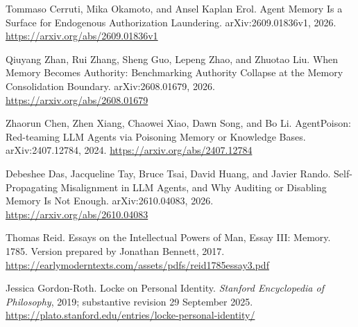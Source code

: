 Tommaso Cerruti, Mika Okamoto, and Ansel Kaplan Erol.
\newblock Agent Memory Is a Surface for Endogenous Authorization Laundering.
\newblock arXiv:2609.01836v1, 2026.
\newblock \url{https://arxiv.org/abs/2609.01836v1}

Qiuyang Zhan, Rui Zhang, Sheng Guo, Lepeng Zhao, and Zhuotao Liu.
\newblock When Memory Becomes Authority: Benchmarking Authority Collapse at the Memory Consolidation Boundary.
\newblock arXiv:2608.01679, 2026.
\newblock \url{https://arxiv.org/abs/2608.01679}

Zhaorun Chen, Zhen Xiang, Chaowei Xiao, Dawn Song, and Bo Li.
\newblock AgentPoison: Red-teaming LLM Agents via Poisoning Memory or Knowledge Bases.
\newblock arXiv:2407.12784, 2024.
\newblock \url{https://arxiv.org/abs/2407.12784}

Debeshee Das, Jacqueline Tay, Bruce Tsai, David Huang, and Javier Rando.
\newblock Self-Propagating Misalignment in LLM Agents, and Why Auditing or Disabling Memory Is Not Enough.
\newblock arXiv:2610.04083, 2026.
\newblock \url{https://arxiv.org/abs/2610.04083}

Thomas Reid.
\newblock Essays on the Intellectual Powers of Man, Essay III: Memory. 1785.
\newblock Version prepared by Jonathan Bennett, 2017.
\newblock \url{https://earlymoderntexts.com/assets/pdfs/reid1785essay3.pdf}

Jessica Gordon-Roth.
\newblock Locke on Personal Identity.
\newblock \textit{Stanford Encyclopedia of Philosophy}, 2019; substantive revision 29 September 2025.
\newblock \url{https://plato.stanford.edu/entries/locke-personal-identity/}
